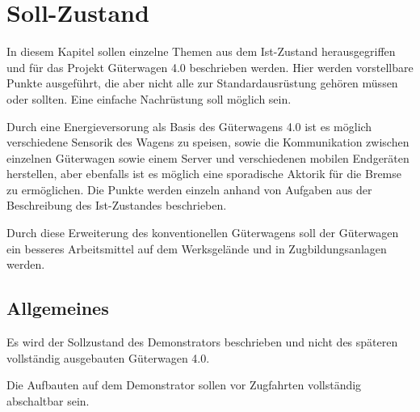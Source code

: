 \section{Soll-Zustand}
In diesem Kapitel sollen einzelne Themen aus dem Ist-Zustand herausgegriffen und für das Projekt Güterwagen 4.0 beschrieben werden. Hier werden vorstellbare Punkte ausgeführt, die aber nicht alle zur Standardausrüstung gehören müssen oder sollten. Eine einfache Nachrüstung soll möglich sein.\par
Durch eine Energieversorung als Basis des Güterwagens 4.0 ist es möglich verschiedene Sensorik des Wagens zu speisen, sowie die Kommunikation zwischen einzelnen Güterwagen sowie einem Server und verschiedenen mobilen Endgeräten herstellen, aber ebenfalls ist es möglich eine sporadische Aktorik für die Bremse zu ermöglichen. Die Punkte werden einzeln anhand von Aufgaben aus der Beschreibung des Ist-Zustandes beschrieben. \par
Durch diese Erweiterung des konventionellen Güterwagens soll der Güterwagen ein besseres Arbeitsmittel auf dem Werksgelände und in Zugbildungsanlagen werden.
\subsection{Allgemeines}
Es wird der Sollzustand des Demonstrators beschrieben und nicht des späteren vollständig ausgebauten Güterwagen 4.0.\par
Die Aufbauten auf dem Demonstrator sollen vor Zugfahrten vollständig abschaltbar sein.
